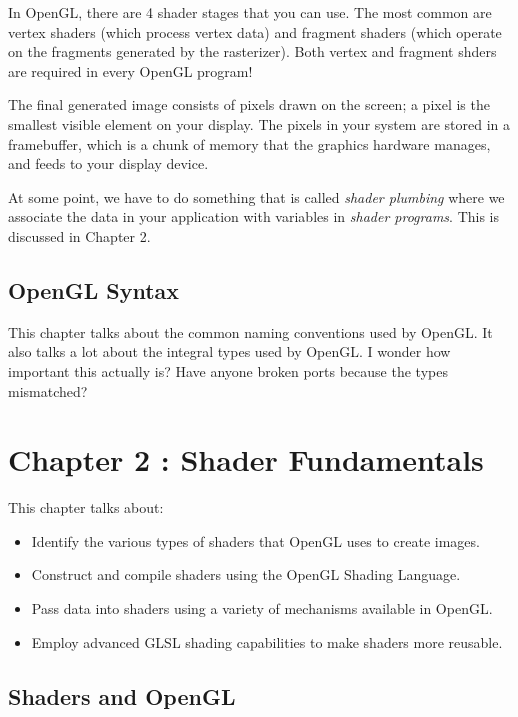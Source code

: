 \documentclass[a4paper, 12pt]{article}
\begin{document}
In OpenGL, there are 4 shader stages that you can use.
The most common are vertex shaders (which process vertex data) and fragment shaders (which operate on the fragments generated by the rasterizer).
Both vertex and fragment shders are required in every OpenGL program!

The final generated image consists of pixels drawn on the screen;
a pixel is the smallest visible element on your display.
The pixels in your system are stored in a framebuffer, which is a chunk of memory that the graphics hardware manages, and feeds to your display device.

At some point, we have to do something that is called \textit{shader plumbing} where we associate the data in your application with variables in \textit{shader programs}.
This is discussed in Chapter 2.

\subsection{OpenGL Syntax}

This chapter talks about the common naming conventions used by OpenGL.
It also talks a lot about the integral types used by OpenGL.
I wonder how important this actually is?
Have anyone broken ports because the types mismatched?

\newpage
\section{Chapter 2 : Shader Fundamentals}

This chapter talks about:

\begin{itemize}
      \item
            Identify the various types of shaders that OpenGL uses to create images.

      \item
            Construct and compile shaders using the OpenGL Shading Language.

      \item
            Pass data into shaders using a variety of mechanisms available in OpenGL.

      \item
            Employ advanced GLSL shading capabilities to make shaders more reusable.

\end{itemize}

\subsection{Shaders and OpenGL}
\end{document}
